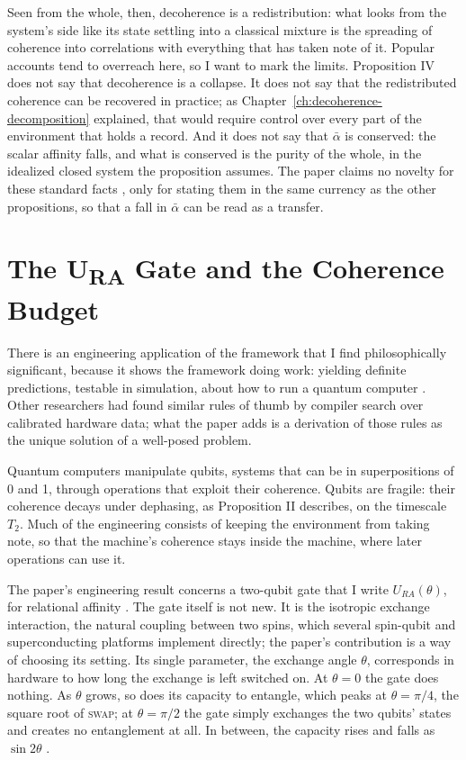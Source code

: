 Seen from the whole, then, decoherence is a redistribution: what looks from the system's side like its state settling into a classical mixture is the spreading of coherence into correlations with everything that has taken note of it. Popular accounts tend to overreach here, so I want to mark the limits. Proposition IV does not say that decoherence is a collapse. It does not say that the redistributed coherence can be recovered in practice; as Chapter~\ref{ch:decoherence-decomposition} explained, that would require control over every part of the environment that holds a record. And it does not say that $\bar{\alpha}$ is conserved: the scalar affinity falls, and what is conserved is the purity of the whole, in the idealized closed system the proposition assumes. The paper claims no novelty for these standard facts \citep{AdamsRCT, Zurek2003, NielsenChuang2000}, only for stating them in the same currency as the other propositions, so that a fall in $\bar{\alpha}$ can be read as a transfer.

\section{The \texorpdfstring{U\textsubscript{RA}}{U\_RA} Gate and the Coherence Budget}
\label{sec:ch13-gate}

There is an engineering application of the framework that I find philosophically significant, because it shows the framework doing work: yielding definite predictions, testable in simulation, about how to run a quantum computer \citep{AdamsRCT}. Other researchers had found similar rules of thumb by compiler search over calibrated hardware data; what the paper adds is a derivation of those rules as the unique solution of a well-posed problem.

Quantum computers manipulate qubits, systems that can be in superpositions of 0 and 1, through operations that exploit their coherence. Qubits are fragile: their coherence decays under dephasing, as Proposition II describes, on the timescale $T_2$. Much of the engineering consists of keeping the environment from taking note, so that the machine's coherence stays inside the machine, where later operations can use it.

The paper's engineering result concerns a two-qubit gate that I write $U_{RA}(\theta)$, for relational affinity \citep{AdamsRCT}. The gate itself is not new. It is the isotropic exchange interaction, the natural coupling between two spins, which several spin-qubit and superconducting platforms implement directly; the paper's contribution is a way of choosing its setting. Its single parameter, the exchange angle $\theta$, corresponds in hardware to how long the exchange is left switched on. At $\theta = 0$ the gate does nothing. As $\theta$ grows, so does its capacity to entangle, which peaks at $\theta = \pi/4$, the square root of \textsc{swap}; at $\theta = \pi/2$ the gate simply exchanges the two qubits' states and creates no entanglement at all. In between, the capacity rises and falls as $\sin 2\theta$ \citep{Zhang2003WeylChamber}.

